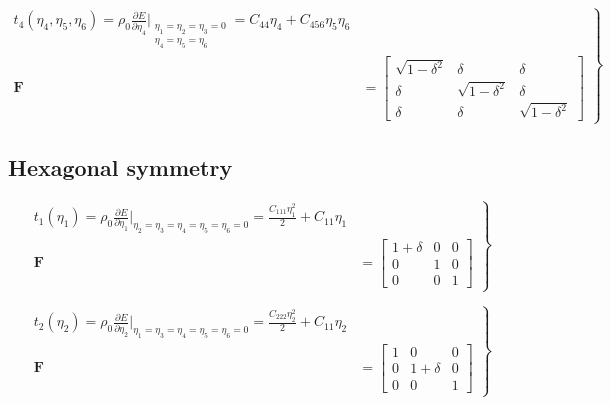 \documentclass[showpacs,aps,floatfix,prb,reprint,superscriptaddress,onecolumn]{revtex4-1}
\begin{document}
\begin{equation}
\label{eqn:SM-hexs7}
  \left.\begin{aligned}
        t_{4} \left(\eta_{4}, \eta_{5}, \eta_{6} \right) = \rho_{0} \frac{\partial E}{\partial \eta_{4}}\Bigr|_{\substack{\eta_1=\eta_2=\eta_3=0 \\ \eta_{4}=\eta_{5}=\eta_{6}}} = C_{44} \eta_{4} + C_{456}\eta_{5}\eta_{6} \\
        \bm{F}&=\begin{bmatrix} \sqrt{1-\delta^{2}} & \delta & \delta \\ \delta & \sqrt{1-\delta^{2}} & \delta \\ \delta & \delta & \sqrt{1-\delta^{2}} \end{bmatrix}
       \end{aligned}
			\right\}
\end{equation}





\subsection{Hexagonal symmetry}


\begin{equation}
\label{eqn:SM-s1}
  \left.\begin{aligned}
        t_{1} \left(\eta_{1}\right) = \rho_{0} \frac{\partial E}{\partial \eta_{1}}\Bigr|_{\eta_2=\eta_3=\eta_4=\eta_5=\eta_6=0} = \frac{C_{111}\eta_{1}^2}{2} + C_{11}\eta_{1}\\
        \bm{F}&=\begin{bmatrix} 1+\delta & 0 & 0 \\ 0 & 1 & 0 \\ 0 & 0 & 1 \end{bmatrix}
       \end{aligned}
			\right\}
\end{equation}

\begin{equation}
\label{eqn:SM-s2}
  \left.\begin{aligned}
        t_{2} \left(\eta_{2}\right) = \rho_{0} \frac{\partial E}{\partial \eta_{2}}\Bigr|_{\eta_1=\eta_3=\eta_4=\eta_5=\eta_6=0} = \frac{C_{222}\eta_{2}^2}{2} + C_{11}\eta_{2}\\
        \bm{F}&=\begin{bmatrix} 1 & 0 & 0 \\ 0 & 1+\delta & 0 \\ 0 & 0 & 1 \end{bmatrix}
       \end{aligned}
			\right\}
\end{equation}
\end{document}
